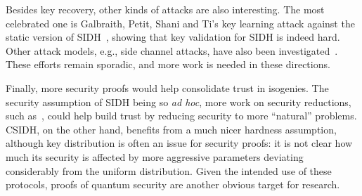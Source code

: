 \documentclass{report}
\theoremstyle{plain}
\theoremstyle{definition}
\begin{document}
Besides key recovery, other kinds of attacks are also interesting. %
The most celebrated one is Galbraith, Petit, Shani and Ti's key
learning attack against the static version of
SIDH~\cite{galbraithsecurity}, showing that key validation for SIDH is
indeed hard. %
Other attack models, e.g., side channel attacks, have also been
investigated~\cite{gelin2017loop,ti2017fault}. %
These efforts remain sporadic, and more work is needed in these
directions. %

Finally, more security proofs would help consolidate trust in
isogenies. %
The security assumption of SIDH being so \emph{ad hoc}, more work on
security reductions, such
as~\cite{galbraithsecurity,cryptoeprint:2017:962}, could help build
trust by reducing security to more ``natural'' problems. %
CSIDH, on the other hand, benefits from a much nicer hardness
assumption, although key distribution is often an issue for security
proofs: it is not clear how much its security is affected by more
aggressive parameters deviating considerably from the uniform
distribution. %
Given the intended use of these protocols, proofs of quantum security
are another obvious target for research.










\clearpage


\end{document}
